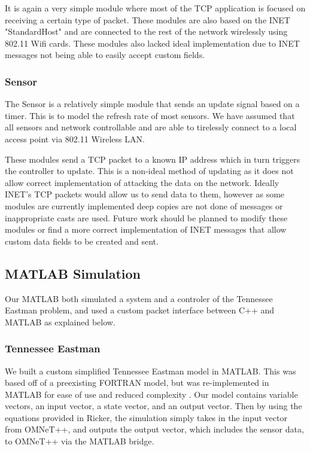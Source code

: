 It is again a very simple module where most of the TCP application is focused on receiving a certain type of packet. These modules are also based on the INET "StandardHost" and are connected to the rest of the network wirelessly using 802.11 Wifi cards. These modules also lacked ideal implementation due to INET messages not being able to easily accept custom fields.  


\subsubsection{Sensor}

The Sensor is a relatively simple module that sends an update signal based on a timer. This 
is to model the refresh rate of most sensors. We have assumed that all sensors and network 
controllable and are able to tirelessly connect to a local access point via 802.11 Wireless 
LAN. 

These modules send a TCP packet to a known IP address which in turn triggers the controller 
to update. This is a non-ideal method of updating as it does not allow correct implementation 
of attacking the data on the network. Ideally INET's TCP packets would allow us to send data 
to them, however as some modules are currently implemented deep copies are not done of 
messages or inappropriate casts are used. Future work should be planned to modify these 
modules or find a more correct implementation of INET messages that allow custom data fields 
to be created and sent. 

\subsection{MATLAB Simulation}
  Our MATLAB both simulated a system and a controler of the
  Tennessee Eastman problem, and used a custom packet interface
  between C++ and MATLAB as explained below.

\subsubsection{Tennessee Eastman}
  We built a custom simplified Tennessee Eastman model in MATLAB.  
  This was based off of a preexisting FORTRAN model, but was
  re-implemented in MATLAB for ease of use and reduced complexity 
  .  Our model contains variable vectors, an
  input vector, a state vector, and an output vector. Then by 
  using the equations provided in Ricker, the
  simulation simply takes in the input vector from OMNeT++, and
  outputs the output vector, which includes the sensor data, to
  OMNeT++ via the MATLAB bridge.

